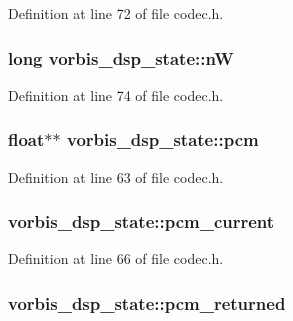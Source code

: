 Definition at line 72 of file codec.\+h.

\subsubsection[{\texorpdfstring{nW}{nW}}]{\setlength{\rightskip}{0pt plus 5cm}long vorbis\+\_\+dsp\+\_\+state\+::nW}\hypertarget{structvorbis__dsp__state_a2ada93ee1004bcc0803238ee4416bc1e}{}\label{structvorbis__dsp__state_a2ada93ee1004bcc0803238ee4416bc1e}


Definition at line 74 of file codec.\+h.

\subsubsection[{\texorpdfstring{pcm}{pcm}}]{\setlength{\rightskip}{0pt plus 5cm}float$\ast$$\ast$ vorbis\+\_\+dsp\+\_\+state\+::pcm}\hypertarget{structvorbis__dsp__state_ab33bafd2638e5bea5737709feea89027}{}\label{structvorbis__dsp__state_ab33bafd2638e5bea5737709feea89027}


Definition at line 63 of file codec.\+h.

\subsubsection[{\texorpdfstring{pcm\+\_\+current}{pcm_current}}]{ vorbis\+\_\+dsp\+\_\+state\+::pcm\+\_\+current}\hypertarget{structvorbis__dsp__state_a6d09bbf3927e337d721b05f669bd70c6}{}\label{structvorbis__dsp__state_a6d09bbf3927e337d721b05f669bd70c6}


Definition at line 66 of file codec.\+h.

\subsubsection[{\texorpdfstring{pcm\+\_\+returned}{pcm_returned}}]{ vorbis\+\_\+dsp\+\_\+state\+::pcm\+\_\+returned}\hypertarget{structvorbis__dsp__state_a8db33e5f4c0b7f31f218c9ff6ccd7ac3}{}\label{structvorbis__dsp__state_a8db33e5f4c0b7f31f218c9ff6ccd7ac3}


